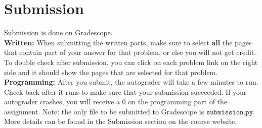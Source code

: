 \documentclass{article}
\theoremstyle{case}
\theoremstyle{definition}
\newcommand{\expect}[1]{\noindent{\fbox{\parbox{0.95 \textwidth}{\textbf{What we expect:} #1}}}}
\begin{document}
  



\newpage
\section*{Submission}

Submission is done on Gradescope. \\

\textbf{Written:} When submitting the written parts, make sure to select \textbf{all} the pages that contain part of your answer for that problem, or else you will not get credit.
To double check after submission, you can click on each problem link on the right side and it should show the pages that are selected for that problem. \\

\textbf{Programming:} After you submit, the autograder will take a few minutes to run. Check back after it runs to make sure that your submission succeeded. If your autograder crashes, you will receive a 0 on the programming part of the assignment. Note: the only file to be submitted to Gradescope is $\texttt{submission.py}$.\\

More details can be found in the Submission section on the course website.
\end{document}
